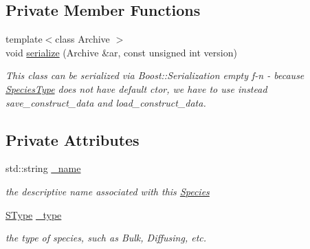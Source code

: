 \subsection*{Private Member Functions}
\begin{DoxyCompactItemize}
\item 
{\footnotesize template$<$class Archive $>$ }\\void \hyperlink{classchem_1_1SpeciesType_aa8715b9f522cda6cc27aa9f9d6ed477c}{serialize} (Archive \&ar, const unsigned int version)
\begin{DoxyCompactList}\small\item\em This class can be serialized via Boost\-::\-Serialization empty f-\/n -\/ because \hyperlink{classchem_1_1SpeciesType}{Species\-Type} does not have default ctor, we have to use instead save\-\_\-construct\-\_\-data and load\-\_\-construct\-\_\-data. \end{DoxyCompactList}\end{DoxyCompactItemize}
\subsection*{Private Attributes}
\begin{DoxyCompactItemize}
\item 
std\-::string \hyperlink{classchem_1_1SpeciesType_ab7c1653d2c84cfafe2fac832778d74af}{\-\_\-name}
\begin{DoxyCompactList}\small\item\em the descriptive name associated with this \hyperlink{classchem_1_1Species}{Species} \end{DoxyCompactList}\item 
\hyperlink{namespacechem_ad1edc1332f82ed64dd8a810596e781da}{S\-Type} \hyperlink{classchem_1_1SpeciesType_ac42a8f904e71a32858821e3c469c09a9}{\-\_\-type}
\begin{DoxyCompactList}\small\item\em the type of species, such as Bulk, Diffusing, etc. \end{DoxyCompactList}\end{DoxyCompactItemize}
